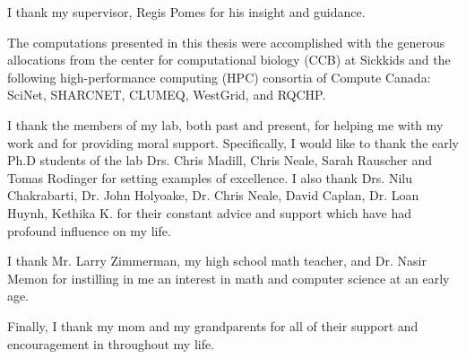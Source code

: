 I thank my supervisor, Regis Pomes for his insight and guidance.

The computations presented in this thesis were accomplished with the generous allocations from the center for computational biology (CCB) at Sickkids and the following high-performance computing (HPC) consortia of Compute Canada: SciNet, SHARCNET, CLUMEQ, WestGrid, and RQCHP.

I thank the members of my lab, both past and present, for helping me with my work and for providing moral support.  Specifically, I would like to thank the early Ph.D students of the lab Drs. Chris Madill, Chris Neale, Sarah Rauscher and Tomas Rodinger for setting examples of excellence.  I also thank Drs. Nilu Chakrabarti, Dr. John Holyoake, Dr. Chris Neale, David Caplan, Dr. Loan Huynh, Kethika K. for their constant advice and support which have had profound influence on my life.

I thank Mr. Larry Zimmerman, my high school math teacher, and Dr. Nasir Memon for instilling in me an interest in math and computer science at an early age.

Finally, I thank my mom and my grandparents for all of their support and encouragement in throughout my life.

